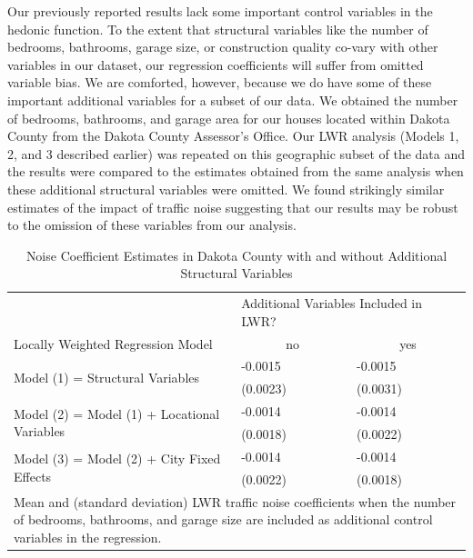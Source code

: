 \documentclass{article}\usepackage{graphicx, color}
\begin{document}
Our previously reported results lack some important control variables in the hedonic function. To the extent that structural variables like the number of bedrooms, bathrooms, garage size, or construction quality co-vary with other variables in our dataset, our regression coefficients will suffer from omitted variable bias. We are comforted, however, because we do have some of these important additional variables for a subset of our data. We obtained the number of bedrooms, bathrooms, and garage area for our houses located within Dakota County from the Dakota County Assessor's Office. Our LWR analysis (Models 1, 2, and 3 described earlier) was repeated on this geographic subset of the data and the results were compared to the estimates obtained from the same analysis when these additional structural variables were omitted. We found strikingly similar estimates of the impact of traffic noise suggesting that our results may be robust to the omission of these variables from our analysis.

\begin{table}[ht]
\begin{center}
\caption{Noise Coefficient Estimates in Dakota County with and without Additional Structural Variables}\label{tab:Dak}
\begin{tabular}{lll}
 & \multicolumn{2}{p{1.25in}}{Additional Variables Included in LWR?} \\
Locally Weighted Regression Model & \multicolumn{1}{c}{no} & \multicolumn{1}{c}{yes} \\ \cline{1-3}
\multirow{2}{*}{Model (1) = Structural Variables} & -0.0015 & -0.0015 \\ 
   & (0.0023) & (0.0031)  \\[.2cm]
\multirow{2}{*}{Model (2) = Model (1) + Locational Variables} & -0.0014 & -0.0014  \\ 
   & (0.0018) & (0.0022)  \\[.2cm] 
\multirow{2}{*}{Model (3) = Model (2) + City Fixed Effects} & -0.0014 & -0.0014 \\ 
   & (0.0022) & (0.0018) \\[.2cm] \cline{1-3}
\multicolumn{3}{p{4.25in}}{Mean and (standard deviation) LWR traffic noise coefficients when the number of bedrooms, bathrooms, and garage size are included as additional control variables in the regression.}
\end{tabular}
\end{center}
\end{table}
\end{document}

